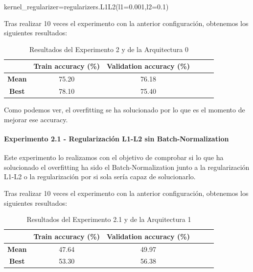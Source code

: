 \documentclass{article}
\begin{document}
            kernel\_regularizer=regularizers.L1L2(l1=0.001,l2=0.1)
			
			
			Tras realizar 10 veces el experimento con la anterior configuraci\'on, obtenemos los siguientes resultados:
			\begin{table}[!h]
				\begin{center}
					\begin{tabular}{ c | c | c | c | c | c |}
						\ & \textbf{Train accuracy (\%)} & \textbf{Validation accuracy (\%)}  \\ \hline
						\textbf{Mean} & 75.20 & 76.18 \\ \hline
						\textbf{Best} & 78.10 & 75.40 \\ \hline
					\end{tabular}
					\caption{Resultados del Experimento 2 y de la Arquitectura 0}
					\label{tab:res-j-a0-e1}
				\end{center}
			\end{table}
		    
		    Como podemos ver, el overfitting se ha solucionado por lo que es el momento de mejorar ese accuracy.
      
      	\paragraph{Experimento 2.1 - Regularizaci\'on L1-L2 sin Batch-Normalization}
		\label{j-s-a0-e2.1} %
			Este experimento lo realizamos con el objetivo de comprobar si lo que ha solucionado el overfitting ha sido el Batch-Normalization junto a la regularizaci\'on L1-L2 o la regularizaci\'on por si sola ser\'ia capaz de solucionarlo.
			
			Tras realizar 10 veces el experimento con la anterior configuraci\'on, obtenemos los siguientes resultados:
			\begin{table}[!h]
				\begin{center}
					\begin{tabular}{ c | c | c | c | c | c |}
						\ & \textbf{Train accuracy (\%)} & \textbf{Validation accuracy (\%)}  \\ \hline
						\textbf{Mean} & 47.64 & 49.97 \\ \hline
						\textbf{Best} & 53.30 & 56.38 \\ \hline
					\end{tabular}
					\caption{Resultados del Experimento 2.1 y de la Arquitectura 1}
					\label{tab:res-j-a0-e2.1}
				\end{center}
			\end{table}
      
\end{document}
